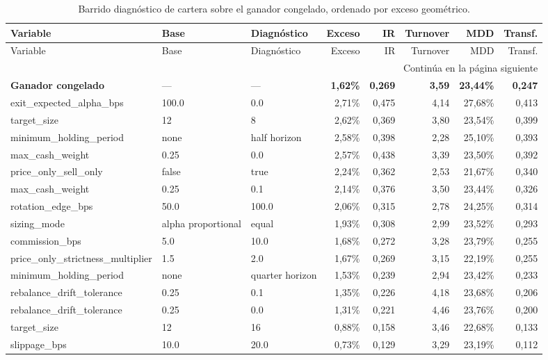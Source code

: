 \begin{longtable}{lllrrrrr}
\caption{Barrido diagnóstico de cartera sobre el ganador congelado, ordenado por exceso geométrico.}\label{tab:cartera-barrido}\\
\toprule
Variable & Base & Diagnóstico & Exceso & IR & Turnover & MDD & Transf. \\
\midrule
\endfirsthead
\toprule
Variable & Base & Diagnóstico & Exceso & IR & Turnover & MDD & Transf. \\
\midrule
\endhead
\midrule
\multicolumn{8}{r}{\footnotesize Continúa en la página siguiente}\\
\endfoot
\bottomrule
\endlastfoot
\textbf{Ganador congelado} & — & — & \textbf{1,62\%} & \textbf{0,269} & \textbf{3,59} & \textbf{23,44\%} & \textbf{0,247} \\
exit\_expected\_alpha\_bps & 100.0 & 0.0 & 2,71\% & 0,475 & 4,14 & 27,68\% & 0,413 \\
target\_size & 12 & 8 & 2,62\% & 0,369 & 3,80 & 23,54\% & 0,399 \\
minimum\_holding\_period & none & half horizon & 2,58\% & 0,398 & 2,28 & 25,10\% & 0,393 \\
max\_cash\_weight & 0.25 & 0.0 & 2,57\% & 0,438 & 3,39 & 23,50\% & 0,392 \\
price\_only\_sell\_only & false & true & 2,24\% & 0,362 & 2,53 & 21,67\% & 0,340 \\
max\_cash\_weight & 0.25 & 0.1 & 2,14\% & 0,376 & 3,50 & 23,44\% & 0,326 \\
rotation\_edge\_bps & 50.0 & 100.0 & 2,06\% & 0,315 & 2,78 & 24,25\% & 0,314 \\
sizing\_mode & alpha proportional & equal & 1,93\% & 0,308 & 2,99 & 23,52\% & 0,293 \\
commission\_bps & 5.0 & 10.0 & 1,68\% & 0,272 & 3,28 & 23,79\% & 0,255 \\
price\_only\_strictness\_multiplier & 1.5 & 2.0 & 1,67\% & 0,269 & 3,15 & 22,19\% & 0,255 \\
minimum\_holding\_period & none & quarter horizon & 1,53\% & 0,239 & 2,94 & 23,42\% & 0,233 \\
rebalance\_drift\_tolerance & 0.25 & 0.1 & 1,35\% & 0,226 & 4,18 & 23,68\% & 0,206 \\
rebalance\_drift\_tolerance & 0.25 & 0.0 & 1,31\% & 0,221 & 4,46 & 23,76\% & 0,200 \\
target\_size & 12 & 16 & 0,88\% & 0,158 & 3,46 & 22,68\% & 0,133 \\
slippage\_bps & 10.0 & 20.0 & 0,73\% & 0,129 & 3,29 & 23,19\% & 0,112 \\

\end{longtable}
